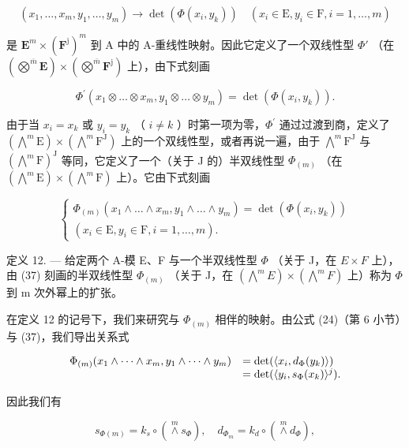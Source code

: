 \[
(x _ {1}, \dots , x _ {m}, y _ {1}, \dots , y _ {m}) \rightarrow \det (\Phi (x _ {i}, y _ {k})) \quad (x _ {i} \in \mathrm{E}, y _ {i} \in \mathrm{F}, i = 1, \dots , m)
\]

是 \(\mathbf{E}^{m}\times(\mathbf{F}^{\mathrm{j}})^{m}\) 到 A 中的 A-重线性映射。因此它定义了一个双线性型 \(\Phi'\) （在 \((\bigotimes^{\overline{m}}\mathbf{E})\times(\bigotimes^{\overline{m}}\mathbf{F}^{\mathrm{j}})\) 上），由下式刻画

\[
\Phi^ {\prime} (x _ {1} \otimes \dots \otimes x _ {m}, y _ {1} \otimes \dots \otimes y _ {m}) = \det (\Phi (x _ {i}, y _ {k})).
\]

由于当 \(x_{i}=x_{k}\) 或 \(y_{i}=y_{k}\) （ \(i\neq k\) ）时第一项为零，\(\Phi^{\prime}\) 通过过渡到商，定义了 \((\bigwedge^{m}\mathrm{E})\times(\bigwedge^{m}\mathrm{F}^{\mathrm{J}})\) 上的一个双线性型，或者再说一遍，由于 \(\bigwedge^{m}\mathrm{F}^{\mathrm{J}}\) 与 \((\bigwedge^{m}\mathrm{F})^{\mathrm{J}}\) 等同，它定义了一个（关于 J 的）半双线性型 \(\Phi_{(m)}\) （在 \((\bigwedge^{m}\mathrm{E})\times(\bigwedge^{m}\mathrm{F})\) 上）。它由下式刻画

\[
\left\{ \begin{array}{l} \Phi_ {(m)} (x _ {1} \wedge \dots \wedge x _ {m}, y _ {1} \wedge \dots \wedge y _ {m}) = \det (\Phi (x _ {i}, y _ {k})) \\ (x _ {i} \in \mathrm{E}, y _ {i} \in \mathrm{F}, i = 1, \dots , m). \end{array} \right.\tag{37}
\]

定义 12. --- 给定两个 A-模 E、F 与一个半双线性型 \(\Phi\) （关于 J，在 \(E \times F\) 上），由 (37) 刻画的半双线性型 \(\Phi_{(m)}\) （关于 J，在 \((\bigwedge^{m} E) \times (\bigwedge^{m} F)\) 上）称为 \(\Phi\) 到 m 次外幂上的扩张。

在定义 12 的记号下，我们来研究与 \(\Phi_{(m)}\) 相伴的映射。由公式 (24)（第 6 小节）与 (37)，我们导出关系式

\[
\begin{array}{r l} \Phi_ {(m)} (x _ {1} \wedge \dots \wedge x _ {m}, y _ {1} \wedge \dots \wedge y _ {m}) & = \det (\langle x _ {i}, d _ {\Phi} (y _ {k}) \rangle) \\ & = \det (\langle y _ {i}, s _ {\Phi} (x _ {k}) \rangle^ {j}). \end{array}
\]

因此我们有

\[
s _ {\Phi (m)} = k _ {s} \circ (\stackrel {m} {\wedge} s _ {\Phi}), \quad d _ {\Phi_ {m}} = k _ {d} \circ (\stackrel {m} {\wedge} d _ {\Phi}),\tag{38}
\]

